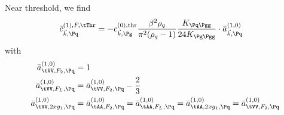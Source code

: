 Near threshold, we find
\begin{align}
\bar c_{\vec k,\Pq}^{(1),F,\tThr} &= -c_{\vec k,\Pg}^{(0),\text{thr}} \frac{\beta^2\rho_q}{\pi^2(\rho_q-1)} \frac{K_{\Pq\Pgg}}{24K_{\Pg\Pgg}} \cdot \bar a_{\vec k,\Pq}^{(1,0)}
\end{align}
with
\begin{align}
\bar a^{(1,0)}_{\tVV,F_2,\Pq} &= 1\\
\bar a^{(1,0)}_{\tVV,F_L,\Pq} &= \bar a^{(1,0)}_{\tVV,F_2,\Pq} - \frac 2 {3}\\
\bar a^{(1,0)}_{\tVV,2xg_1,\Pq} &= \bar a^{(1,0)}_{\tAA,F_2,\Pq} = \bar a^{(1,0)}_{\tAA,F_L,\Pq} = \bar a^{(1,0)}_{\tAA,2xg_1,\Pq} = \bar a^{(1,0)}_{\tVV,F_2,\Pq}
\end{align}
